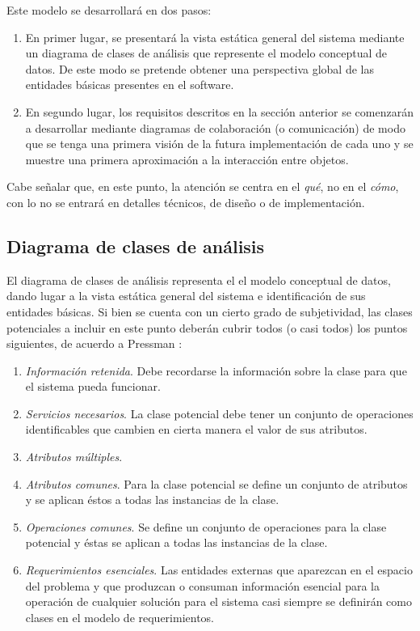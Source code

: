 Este modelo se desarrollará en dos pasos: 

\begin{enumerate}  
	\item En primer lugar, se presentará la vista estática general del sistema mediante un diagrama de clases de análisis que represente el modelo conceptual de datos. De este modo se pretende obtener una perspectiva global de las entidades básicas presentes en el software.
	\item En segundo lugar, los requisitos descritos en la sección anterior se comenzarán a desarrollar mediante diagramas de colaboración (o comunicación) de modo que se tenga una primera visión de la futura implementación de cada uno y se muestre una primera aproximación a la interacción entre objetos.
\end{enumerate}

Cabe señalar que, en este punto, la atención se centra en el \emph{qué}, no en el \emph{cómo}, con lo no se entrará en detalles técnicos, de diseño o de implementación.

\subsection{Diagrama de clases de análisis}

El diagrama de clases de análisis representa el el modelo conceptual de datos, dando lugar a la vista estática general del sistema e identificación de sus entidades básicas. Si bien se cuenta con un cierto grado de subjetividad, las clases potenciales a incluir en este punto deberán cubrir todos (o casi todos) los puntos siguientes, de acuerdo a Pressman \cite{pressman10}:

\begin{enumerate}  
	\item \textit{Información retenida}. Debe recordarse la información sobre la clase para que el sistema pueda funcionar.
	\item \textit{Servicios necesarios}. La clase potencial debe tener un conjunto de operaciones identificables que cambien en cierta manera el valor de sus atributos.
	\item \textit{Atributos múltiples}.
	\item \textit{Atributos comunes}. Para la clase potencial se define un conjunto de atributos y se aplican éstos a todas las instancias de la clase.
	\item \textit{Operaciones comunes}. Se define un conjunto de operaciones para la clase potencial y éstas se aplican a todas las instancias de la clase.
	\item \textit{Requerimientos esenciales}. Las entidades externas que aparezcan en el espacio del problema y que produzcan o consuman información esencial para la operación de cualquier solución para el sistema casi siempre se definirán como clases en el modelo de requerimientos.	
\end{enumerate}

